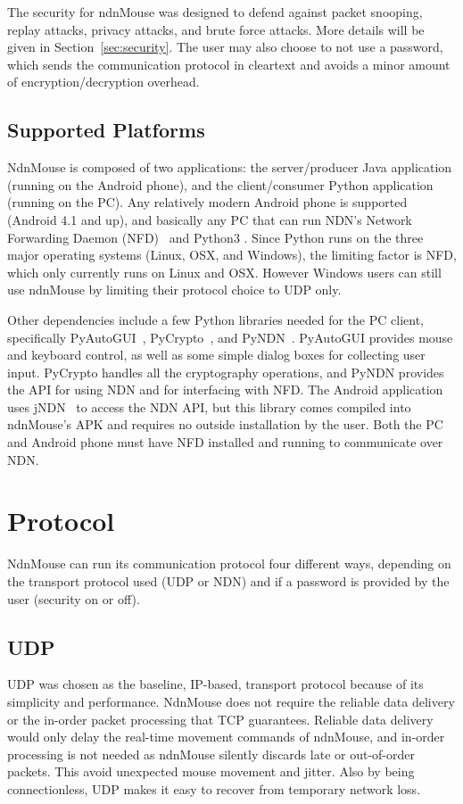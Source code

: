 \documentclass{sig-alternate}
\renewcommand\_{\textunderscore\allowbreak}  %
\begin{document}
The security for ndnMouse was designed to defend against packet snooping, replay attacks, privacy attacks, and brute force attacks. More details will be given in Section~\ref{sec:security}. The user may also choose to not use a password, which sends the communication protocol in cleartext and avoids a minor amount of encryption/decryption overhead. 

\subsection{Supported Platforms}
NdnMouse is composed of two applications: the server/producer Java application (running on the Android phone), and the client/consumer Python application (running on the PC). Any relatively modern Android phone is supported (Android 4.1 and up), and basically any PC that can run NDN's Network Forwarding Daemon (NFD)~\cite{nfd} and Python3 \cite{python3}. Since Python runs on the three major operating systems (Linux, OSX, and Windows), the limiting factor is NFD, which only currently runs on Linux and OSX. However Windows users can still use ndnMouse by limiting their protocol choice to UDP only.

Other dependencies include a few Python libraries needed for the PC client, specifically PyAutoGUI~\cite{pyautogui}, PyCrypto~\cite{pycrypto}, and PyNDN~\cite{pyndn}. PyAutoGUI provides mouse and keyboard control, as well as some simple dialog boxes for collecting user input. PyCrypto handles all the cryptography operations, and PyNDN provides the API for using NDN and for interfacing with NFD. The Android application uses jNDN~\cite{jndn} to access the NDN API, but this library comes compiled into ndnMouse's APK and requires no outside installation by the user. Both the PC and Android phone must have NFD installed and running to communicate over NDN.

\section{Protocol}
\label{sec:protocol}
NdnMouse can run its communication protocol four different ways, depending on the transport protocol used (UDP or NDN) and if a password is provided by the user (security on or off).

\subsection{UDP}
UDP was chosen as the baseline, IP-based, transport protocol because of its simplicity and performance. NdnMouse does not require the reliable data delivery or the in-order packet processing that TCP guarantees. Reliable data delivery would only delay the real-time movement commands of ndnMouse, and in-order processing is not needed as ndnMouse silently discards late or out-of-order packets. This avoid unexpected mouse movement and jitter. Also by being connectionless, UDP makes it easy to recover from temporary network loss. 
\end{document}
